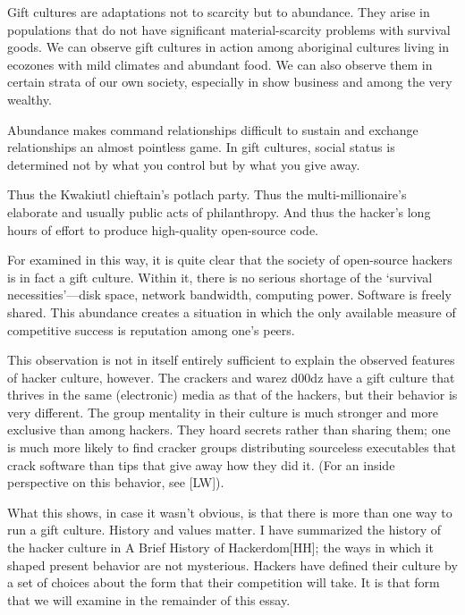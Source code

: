 Gift cultures are adaptations not to scarcity but to abundance.  They arise in
populations that do not have significant material-scarcity problems with
survival goods.  We can observe gift cultures in action among aboriginal
cultures living in ecozones with mild climates and abundant food.  We can also
observe them in certain strata of our own society, especially in show business
and among the very wealthy.

Abundance makes command relationships difficult to sustain and exchange
relationships an almost pointless game.  In gift cultures, social status is
determined not by what you control but by what you give away.

Thus the Kwakiutl chieftain's potlach party.  Thus the multi-millionaire's
elaborate and usually public acts of philanthropy.  And thus the hacker's long
hours of effort to produce high-quality open-source code.

For examined in this way, it is quite clear that the society of open-source
hackers is in fact a gift culture.  Within it, there is no serious shortage of
the `survival necessities'—disk space, network bandwidth, computing power.
Software is freely shared.  This abundance creates a situation in which the only
available measure of competitive success is reputation among one's peers.

This observation is not in itself entirely sufficient to explain the observed
features of hacker culture, however.  The crackers and warez d00dz have a gift
culture that thrives in the same (electronic) media as that of the hackers, but
their behavior is very different.  The group mentality in their culture is much
stronger and more exclusive than among hackers.  They hoard secrets rather than
sharing them; one is much more likely to find cracker groups distributing
sourceless executables that crack software than tips that give away how they did
it.  (For an inside perspective on this behavior, see [LW]).

What this shows, in case it wasn't obvious, is that there is more than one way
to run a gift culture.  History and values matter.  I have summarized the
history of the hacker culture in A Brief History of Hackerdom[HH]; the ways in
which it shaped present behavior are not mysterious.  Hackers have defined their
culture by a set of choices about the form that their competition will take.  It
is that form that we will examine in the remainder of this essay.
